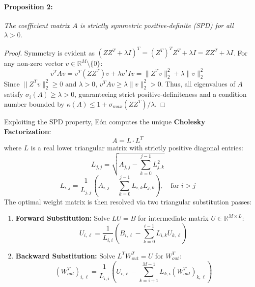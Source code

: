 \paragraph{Proposition 2:} \textit{The coefficient matrix $A$ is strictly symmetric positive-definite (SPD) for all $\lambda > 0$.}
\begin{proof}
Symmetry is evident as $(Z Z^T + \lambda I)^T = (Z^T)^T Z^T + \lambda I = Z Z^T + \lambda I$. For any non-zero vector $v \in \mathbb{R}^M \setminus \{0\}$:
\begin{equation}
    v^T A v = v^T (Z Z^T) v + \lambda v^T I v = \|Z^T v\|_2^2 + \lambda \|v\|_2^2
\end{equation}
Since $\|Z^T v\|_2^2 \ge 0$ and $\lambda > 0$, $v^T A v \ge \lambda \|v\|_2^2 > 0$. Thus, all eigenvalues of $A$ satisfy $\sigma_i(A) \ge \lambda > 0$, guaranteeing strict positive-definiteness and a condition number bounded by $\kappa(A) \le 1 + \sigma_{max}(Z Z^T) / \lambda$.
\end{proof}

Exploiting the SPD property, Eón computes the unique \textbf{Cholesky Factorization}:
\begin{equation}
    A = L \cdot L^T
    \label{eq:cholesky}
\end{equation}
where $L$ is a real lower triangular matrix with strictly positive diagonal entries:
\begin{equation}
    L_{j,j} = \sqrt{A_{j,j} - \sum_{k=0}^{j-1} L_{j,k}^2}
\end{equation}
\begin{equation}
    L_{i,j} = \frac{1}{L_{j,j}} \left( A_{i,j} - \sum_{k=0}^{j-1} L_{i,k} L_{j,k} \right), \quad \text{for } i > j
\end{equation}
The optimal weight matrix is then resolved via two triangular substitution passes:
\begin{enumerate}
    \item \textbf{Forward Substitution:} Solve $L U = B$ for intermediate matrix $U \in \mathbb{R}^{M \times L}$:
    \begin{equation}
        U_{i, \ell} = \frac{1}{L_{i,i}} \left( B_{i, \ell} - \sum_{k=0}^{i-1} L_{i,k} U_{k, \ell} \right)
    \end{equation}
    \item \textbf{Backward Substitution:} Solve $L^T W_{out}^T = U$ for $W_{out}^T$:
    \begin{equation}
        (W_{out}^T)_{i, \ell} = \frac{1}{L_{i,i}} \left( U_{i, \ell} - \sum_{k=i+1}^{M-1} L_{k,i} (W_{out}^T)_{k, \ell} \right)
    \end{equation}
\end{enumerate}

